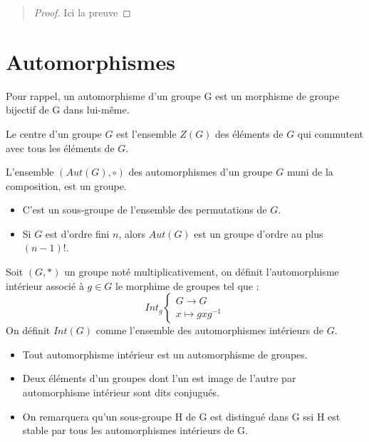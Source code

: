 \begin{quote}
	\footnotesize
	\begin{proof}
		Ici la preuve
    \end{proof}
	\normalsize
\end{quote}


\newpage
\section{Automorphismes}

Pour rappel, un automorphisme d'un groupe G est un morphisme de groupe bijectif de G dans lui-même.

\begin{definition}
    Le centre d'un groupe $G$ est l'ensemble $Z(G)$ des éléments de $G$ qui commutent avec tous les éléments de $G$.
\end{definition}

\begin{theorem}[Automorphismes]
    L'ensemble $(Aut(G),\circ)$ des automorphismes d'un groupe $G$ muni de la composition, est un groupe.
    \begin{itemize}
        \item C'est un sous-groupe de l'ensemble des permutations de $G$. 
        \item Si $G$ est d'ordre fini $n$, alors $Aut(G)$ est un groupe d'ordre au plus $(n-1)!$.
    \end{itemize}
\end{theorem}

\begin{definition}
    Soit $(G,\ast)$ un groupe noté multiplicativement, on définit l'automorphisme intérieur associé à $g \in G$ le morphime
    de groupes tel que :
    \[  Int_g
        \begin{cases}
            G \longrightarrow G \\
            x \longmapsto gxg^{-1}
        \end{cases}
    \]
    On définit $Int(G)$ comme l'ensemble des automorphismes intérieurs de $G$.
\end{definition}

\begin{remark}
    \begin{itemize}
        \item Tout automorphisme intérieur est un automorphisme de groupes. 
        \item Deux éléments d'un groupes dont l'un est image de l'autre par automorphisme intérieur sont dits conjugués. 
        \item On remarquera qu'un sous-groupe H de G est distingué dans G ssi H est stable par tous les automorphismes intérieurs de G. 
    \end{itemize}
\end{remark}
